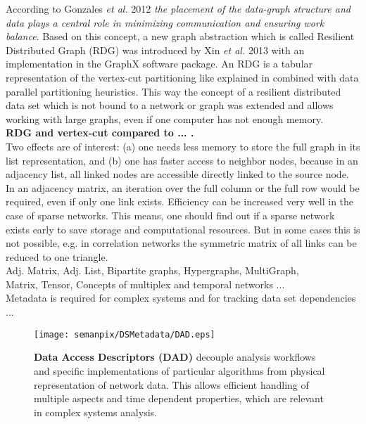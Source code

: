 \documentclass[a4paper,10pt]{scrbook}
\begin{document}
According to Gonzales \textit{et al.} 2012 \cite{Gonzales.2012} \textit{the placement of the data-graph structure and data plays a central role in minimizing communication and ensuring work balance}. Based on this concept, a new graph abstraction which is called Resilient Distributed Graph (RDG) was introduced by Xin \textit{et al.} 2013 \cite{Xin.2013} with an implementation in the GraphX software package. An RDG is a tabular representation of the vertex-cut partitioning like explained in \cite{Gonzales.2012} combined with data parallel partitioning heuristics. This way the concept of a resilient distributed data set which is not bound to a network or graph was extended and allows working with large graphs, even if one computer has not enough memory. \\


\textbf{RDG and vertex-cut compared to ... .}\\

Two effects are of interest: (a) one needs less memory to store the full graph in its list representation, and (b) one has faster access to neighbor nodes, because in an adjacency list, all linked nodes are accessible directly linked to the source node. In an adjacency matrix, an iteration over the full column or the full row would be required, even if only one link exists. Efficiency can be increased very well in the case of sparse networks. This means, one should find out if a sparse network exists early to save storage and computational resources. But in some cases this is not possible, e.g. in correlation networks the symmetric matrix of all links can be reduced to one triangle. \\

Adj. Matrix, Adj. List, Bipartite graphs, Hypergraphs, MultiGraph, \\





Matrix, Tensor, Concepts of multiplex and temporal networks ... \\

Metadata is required for complex systems and for tracking data set dependencies ... \\

\begin{figure}[h!]
  \centering
      \texttt{[image: semanpix/DSMetadata/DAD.eps]}
     \caption[\textbf{Data Access Descriptors (DAD)} connect meta information of distributed data sets for efficient handling of multi-layer and time dependent networks.]{\textbf{Data Access Descriptors (DAD)} decouple analysis workflows and specific implementations of particular algorithms from physical representation of network data. This allows efficient handling of multiple aspects and time dependent properties, which are relevant in complex systems analysis.}
     \label{fig.DAD} 
\end{figure}
\end{document}
